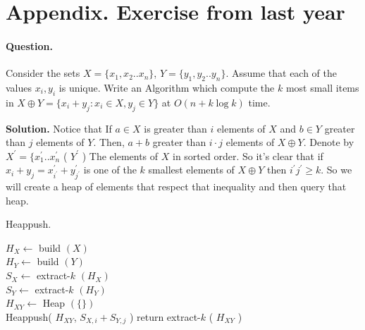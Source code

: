   \newpage
\section{ Appendix. Exercise from last year }

\paragraph{Question.} Consider the sets $X = \{x_1,x_2 .. x_n\}$, $Y = \{y_1, y_2 .. y_n\}$. Assume that each of the values $x_i,y_i$ is unique. Write an Algorithm which compute the $k$ most small items in $X \oplus Y = \{ x_{i} + y_{j} : x_{i} \in X , y_{j} \in Y  \} $ at $ O \left( n + k\log k  \right) $ time. 

\textbf{Solution.} Notice that If $a \in X$ is greater than $i$ elements of $X$ and $b \in Y$ greater than $j$ elements of $Y$. Then, $a + b$  greater than $i\cdot j$ elements of $X \oplus Y$. Denote by $X^\prime = \{ x^{\prime}_{1} .. x^{\prime}_{n}$ ( $Y^{\prime}$ ) The elements of $X$ in sorted order. So it's clear that if $x_{i}+y_{j} = x^{\prime}_{i^{\prime}} + y^{\prime}_{j^{\prime}}$ is one of the $k$ smallest elements of $X\oplus Y$ then $i^{\prime}j^{\prime} \ge k$. So we will create a heap of elements that respect that inequality and then query that heap.

\begin{algbox}{Heappush.}
\begin{algorithm}[H]
$ H_{X} \leftarrow $ build $\left( X \right)$  \\ 
$ H_{Y} \leftarrow $ build $\left( Y \right)$  \\
$ S_{X} \leftarrow $ extract-$k$ $\left( H_{X} \right)$  \\ 
$ S_{Y} \leftarrow $ extract-$k$ $\left( H_{Y} \right)$  \\
$ H_{XY} \leftarrow $ Heap $(\{ \} )$ \\
 {
   {
  	Heappush( $H_{XY}$, $S_{X,i} + S_{Y, j}$ )    
  }
}
return extract-$k$ ( $H_{XY}$ ) 
\end{algorithm}
\end{algbox}



